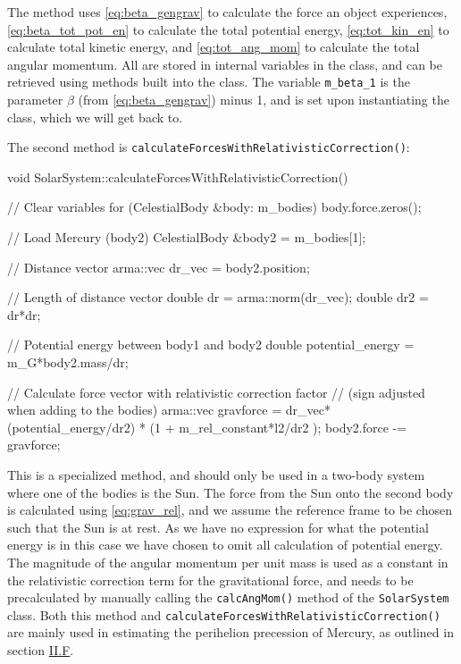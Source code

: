 \documentclass[reprint,english,notitlepage]{revtex4-1}  %
\begin{document}
The method uses \eqref{eq:beta_gengrav} to calculate the force an object experiences, \eqref{eq:beta_tot_pot_en} to calculate the total potential energy, \eqref{eq:tot_kin_en} to calculate total kinetic energy, and \eqref{eq:tot_ang_mom} to calculate the total angular momentum. All are stored in internal variables in the class, and can be retrieved using methods built into the class. The variable \verb+m_beta_1+ is the parameter $\beta$ (from \eqref{eq:beta_gengrav}) minus 1, and is set upon instantiating the class, which we will get back to.

The second method is \verb+calculateForcesWithRelativisticCorrection()+:

\begin{cpp}
void SolarSystem::calculateForcesWithRelativisticCorrection() {
  // Clear variables
  for (CelestialBody &body: m_bodies) {
    body.force.zeros();
  }

  // Load Mercury (body2)
  CelestialBody &body2 = m_bodies[1];

  // Distance vector
  arma::vec dr_vec = body2.position;

  // Length of distance vector
  double dr = arma::norm(dr_vec);
  double dr2 = dr*dr;

  // Potential energy between body1 and body2
  double potential_energy = m_G*body2.mass/dr;

  // Calculate force vector with relativistic correction factor
  // (sign adjusted when adding to the bodies)
  arma::vec gravforce = dr_vec*(potential_energy/dr2)
  						* (1 + m_rel_constant*l2/dr2 );
  body2.force -= gravforce;
}
\end{cpp}

This is a specialized method, and should only be used in a two-body system where one of the bodies is the Sun. The force from the Sun onto the second body is calculated using \eqref{eq:grav_rel}, and we assume the reference frame to be chosen such that the Sun is at rest. As we have no expression for what the potential energy is in this case we have chosen to omit all calculation of potential energy. The magnitude of the angular momentum per unit mass is used as a constant in the relativistic correction term for the gravitational force, and needs to be precalculated by manually calling the \verb+calcAngMom()+ method of the \verb+SolarSystem+ class. Both this method and \verb+calculateForcesWithRelativisticCorrection()+ are mainly used in estimating the perihelion precession of Mercury, as outlined in section \hyperref[sec:II:f]{II.F}.
\end{document}
